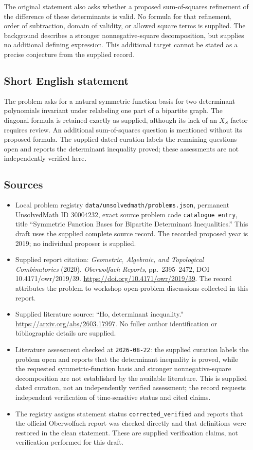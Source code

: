 \documentclass[11pt]{article}
\begin{document}
The original statement also asks whether a proposed sum-of-squares refinement of the difference of these determinants is valid. No formula for that refinement, order of subtraction, domain of validity, or allowed square terms is supplied. The background describes a stronger nonnegative-square decomposition, but supplies no additional defining expression. This additional target cannot be stated as a precise conjecture from the supplied record.
\subsection{Short English statement}
The problem asks for a natural symmetric-function basis for two determinant polynomials invariant under relabeling one part of a bipartite graph. The diagonal formula is retained exactly as supplied, although its lack of an \(X_S\) factor requires review. An additional sum-of-squares question is mentioned without its proposed formula. The supplied dated curation labels the remaining questions open and reports the determinant inequality proved; these assessments are not independently verified here.
\subsection{Sources}
\begin{itemize}
\item Local problem registry \texttt{data/unsolvedmath/problems.json}, permanent UnsolvedMath ID \(30004232\), exact source problem code \texttt{catalogue entry}, title ``Symmetric Function Bases for Bipartite Determinant Inequalities.'' This draft uses the supplied complete source record. The recorded proposed year is 2019; no individual proposer is supplied.
\item Supplied report citation: \emph{Geometric, Algebraic, and Topological Combinatorics} (2020), \emph{Oberwolfach Reports}, pp.~2395--2472, DOI 10.4171/owr/2019/39. \url{https://doi.org/10.4171/owr/2019/39}. The record attributes the problem to workshop open-problem discussions collected in this report.
\item Supplied literature source: ``Ho, determinant inequality.'' \url{https://arxiv.org/abs/2603.17997}. No fuller author identification or bibliographic details are supplied.
\item Literature assessment checked at \texttt{2026-08-22}: the supplied curation labels the problem open and reports that the determinant inequality is proved, while the requested symmetric-function basis and stronger nonnegative-square decomposition are not established by the available literature. This is supplied dated curation, not an independently verified assessment; the record requests independent verification of time-sensitive status and cited claims.
\item The registry assigns statement status \texttt{corrected\_verified} and reports that the official Oberwolfach report was checked directly and that definitions were restored in the clean statement. These are supplied verification claims, not verification performed for this draft.
\end{itemize}
\end{document}
